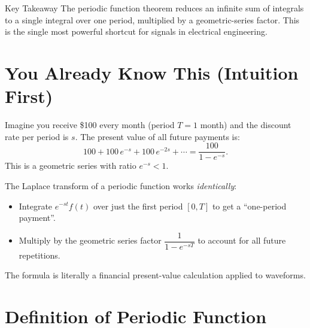 \documentclass[12pt,a4paper]{article}
\begin{document}
\begin{learnbox}{Key Takeaway}
The periodic function theorem reduces an infinite sum of integrals to a
single integral over one period, multiplied by a geometric-series factor.
This is the single most powerful shortcut for signals in electrical
engineering.
\end{learnbox}

\section{You Already Know This (Intuition First)}

Imagine you receive \$100 every month (period $T = 1$ month) and the
discount rate per period is $s$.  The present value of all future payments is:
\[
  100 + 100\,e^{-s} + 100\,e^{-2s} + \cdots
  = \frac{100}{1 - e^{-s}}.
\]
This is a geometric series with ratio $e^{-s} < 1$.

The Laplace transform of a periodic function works \emph{identically}:
\begin{itemize}
  \item Integrate $e^{-st}f(t)$ over just the first period $[0,T]$ to get a
        ``one-period payment''.
  \item Multiply by the geometric series factor $\dfrac{1}{1-e^{-sT}}$ to
        account for all future repetitions.
\end{itemize}
The formula is literally a financial present-value calculation applied to
waveforms.

\section{Definition of Periodic Function}
\end{document}

